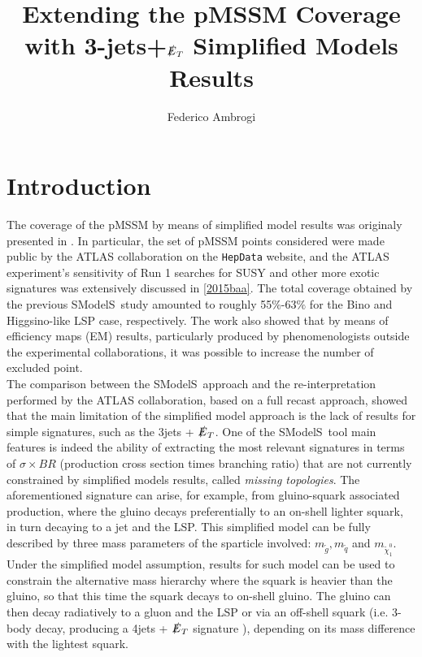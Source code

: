 \documentclass[a4paper,11pt]{article}
\title{\boldmath Extending the pMSSM Coverage with 3-jets+$\slashed{E}_T$ Simplified Models Results}
\author[a]{Federico Ambrogi}
\affiliation[a]{University of Vienna, Faculty of Physics, Bolzmanngasse 5, A-1090 Wien, Austria}
\newcommand{\SMO}{{\sc SModelS}}
\begin{document}
 
\maketitle
                
                                           

\sffamily
\flushbottom

\section{Introduction}

The coverage of the pMSSM by means of simplified model results was originaly presented in \cite{Ambrogi:2017lov}. In particular, the set of pMSSM points considered were made public by the ATLAS collaboration on the \texttt{HepData} website\cite{ATLASpMSSMhepdata}, and the ATLAS experiment's sensitivity of Run 1 searches for SUSY and other more exotic signatures was extensively discussed in \ref{2015baa}. The total coverage obtained by the previous \SMO~study amounted to roughly 55$\%$-63$\%$ for the Bino and Higgsino-like LSP case, respectively. The work also showed that by means of efficiency maps (EM) results, particularly produced by phenomenologists outside the experimental collaborations, it was possible to increase the number of excluded point.
\\

The comparison between the \SMO~approach and the re-interpretation performed by the ATLAS collaboration, based on a full recast approach, showed that the main limitation of the simplified model approach is the lack of results for simple signatures, such as the 3jets + $\slashed{E}_T$. One of the \SMO~tool main features is indeed the ability of extracting the most relevant signatures in terms of $\sigma \times BR$ (production cross section  times branching ratio) that are not currently constrained by simplified models results, called \textit{missing topologies}. The aforementioned signature can arise, for example, from gluino-squark associated production, where the gluino decays preferentially to an on-shell lighter squark, in turn decaying to a jet and the LSP. This simplified model can be fully described by three mass parameters of the sparticle involved: $m_{\tilde g}, m_{\tilde q}$ and $m_{\tilde \chi _1 ^0}$. Under the simplified model assumption, results for such model can be used to constrain the alternative mass hierarchy where the squark is heavier than the gluino, so that this time the squark decays to on-shell gluino. The gluino can then decay radiatively to a gluon and the LSP or via an off-shell squark (i.e. 3-body decay, producing a 4jets + $\slashed{E}_T$ signature ), depending on its mass difference with the lightest squark. 
\\
\end{document}
